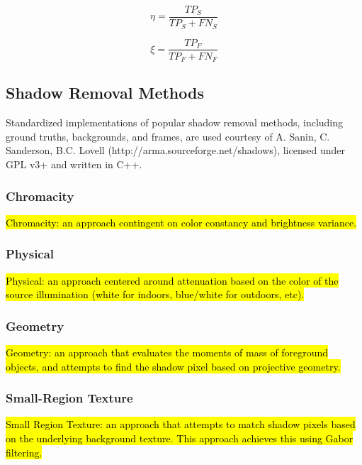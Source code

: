 \documentclass[12pt]{report}
\begin{document}
\begin{equation}
\eta = \dfrac{TP_{S}}{TP_{S} + FN_{S}} \label{eqn:detection}
\end{equation}

\begin{equation}
\xi = \dfrac{TP_{F}}{TP_{F} + FN_{F}} \label{eqn:discrimination}
\end{equation}

\subsection{Shadow Removal Methods}

Standardized implementations of popular shadow removal methods, including ground truths, backgrounds, and frames, are used courtesy of A. Sanin, C. Sanderson, B.C. Lovell (http://arma.sourceforge.net/shadows), licensed under GPL v3+ and written in C++.

\subsubsection{Chromacity}

\hl{Chromacity: an approach contingent on color constancy and brightness variance.}

\subsubsection{Physical}

\hl{Physical: an approach centered around attenuation based on the color of the source illumination (white for indoors, blue/white for outdoors, etc).}

\subsubsection{Geometry}

\hl{Geometry: an approach that evaluates the moments of mass of foreground objects, and attempts to find the shadow pixel based on projective geometry.}

\subsubsection{Small-Region Texture}

\hl{Small Region Texture: an approach that attempts to match shadow pixels based on the underlying background texture. This approach achieves this using Gabor filtering.}
\end{document}
